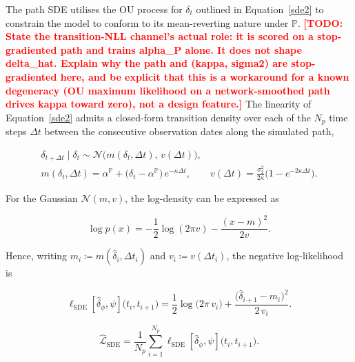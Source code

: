 \documentclass[11pt, a4paper]{article}
\newcommand{\todo}[1]{\textcolor{red}{\textbf{[TODO: #1]}}}
\begin{document}
The path SDE utilises the OU process for $\delta_t$ outlined in
Equation~\ref{sde2}
to constrain the model to conform to its mean-reverting
nature under $\mathbb{P}$.
\todo{State the transition-NLL channel's actual role: it is scored on a
  stop-gradiented path and trains alpha\_P alone. It does not shape delta\_hat.
  Explain why the path and (kappa, sigma2) are stop-gradiented here, and be
  explicit that this is a workaround for a known degeneracy (OU maximum
  likelihood on a network-smoothed path drives kappa toward zero), not a
  design feature.}
The linearity of
Equation~\ref{sde2} admits a closed-form transition density over each of the
$N_p$ time steps $\Delta t$ between the consecutive observation dates along
the simulated path,

\begin{equation}
\begin{gathered}
  \delta_{t+\Delta t} \mid \delta_t \sim \mathcal{N}\!\big(m(\delta_t, \Delta t),\, v(\Delta t)\big), \\
  m(\delta_t, \Delta t) = \alpha^{\mathbb{P}} + \big(\delta_t - \alpha^{\mathbb{P}}\big)\,e^{-\kappa \Delta t}, \qquad
  v(\Delta t) = \frac{\sigma_2^2}{2\kappa} \Big(1 - e^{-2\kappa \Delta t}\Big).
\end{gathered}
\end{equation}

For the Gaussian $\mathcal{N}(m, v)$, the log-density can be expressed as

\begin{equation}
  \log p(x) = -\frac{1}{2} \log(2\pi v) - \frac{(x-m)^2}{2v}.
\end{equation}

Hence, writing $m_i \coloneqq m(\hat{\delta}_i, \Delta t_i)$ and $v_i \coloneqq v(\Delta t_i)$, the negative log-likelihood is

\begin{equation}
    \ell_{\text{SDE}}[\hat{\delta}_\phi, \psi]\big( t_i, t_{i+1}
  \big)
    = \frac{1}{2}\log\!\big(2\pi\, v_i\big)
      + \frac{\big(\hat{\delta}_{i+1} - m_i\big)^2}{2\,v_i}.
\end{equation}

\begin{equation}
    \hat{\mathcal{L}}_{\text{SDE}} = \frac{1}{N_p}
  \sum_{i=1}^{N_p}
    \ell_{\text{SDE}}[\hat{\delta}_\phi, \psi]\big( t_i, t_{i+1}
  \big).
\end{equation}
\end{document}

